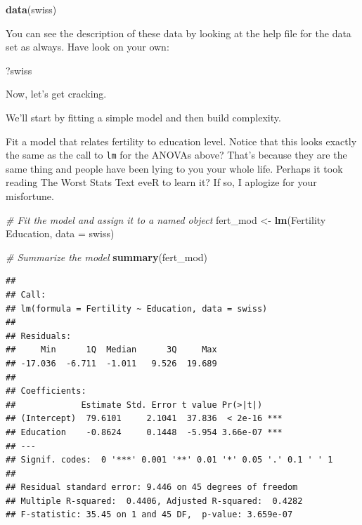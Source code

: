 \documentclass[
]{book}
\newenvironment{Shaded}{\begin{snugshade}}{\end{snugshade}}
\newcommand{\CommentTok}[1]{\textcolor[rgb]{0.56,0.35,0.01}{\textit{#1}}}
\newcommand{\DataTypeTok}[1]{\textcolor[rgb]{0.13,0.29,0.53}{#1}}
\newcommand{\KeywordTok}[1]{\textcolor[rgb]{0.13,0.29,0.53}{\textbf{#1}}}
\newcommand{\NormalTok}[1]{#1}
\newcommand{\OperatorTok}[1]{\textcolor[rgb]{0.81,0.36,0.00}{\textbf{#1}}}
\newcommand{\StringTok}[1]{\textcolor[rgb]{0.31,0.60,0.02}{#1}}
\begin{document}
\begin{Shaded}
\begin{Highlighting}[]
\KeywordTok{data}\NormalTok{(swiss)}
\end{Highlighting}
\end{Shaded}

You can see the description of these data by looking at the help file for the data set as always. Have look on your own:

\begin{Shaded}
\begin{Highlighting}[]
\NormalTok{?swiss}
\end{Highlighting}
\end{Shaded}

Now, let's get cracking.

We'll start by fitting a simple model and then build complexity.

Fit a model that relates fertility to education level. Notice that this looks exactly the same as the call to \texttt{lm} for the ANOVAs above? That's because they are the same thing and people have been lying to you your whole life. Perhaps it took reading The Worst Stats Text eveR to learn it? If so, I aplogize for your misfortune.

\begin{Shaded}
\begin{Highlighting}[]
\CommentTok{# Fit the model and assign it to a named object}
\NormalTok{fert_mod <-}\StringTok{ }\KeywordTok{lm}\NormalTok{(Fertility }\OperatorTok{~}\StringTok{ }\NormalTok{Education, }\DataTypeTok{data =}\NormalTok{ swiss)}

\CommentTok{# Summarize the model}
\KeywordTok{summary}\NormalTok{(fert_mod)}
\end{Highlighting}
\end{Shaded}

\begin{verbatim}
## 
## Call:
## lm(formula = Fertility ~ Education, data = swiss)
## 
## Residuals:
##     Min      1Q  Median      3Q     Max 
## -17.036  -6.711  -1.011   9.526  19.689 
## 
## Coefficients:
##             Estimate Std. Error t value Pr(>|t|)    
## (Intercept)  79.6101     2.1041  37.836  < 2e-16 ***
## Education    -0.8624     0.1448  -5.954 3.66e-07 ***
## ---
## Signif. codes:  0 '***' 0.001 '**' 0.01 '*' 0.05 '.' 0.1 ' ' 1
## 
## Residual standard error: 9.446 on 45 degrees of freedom
## Multiple R-squared:  0.4406,	Adjusted R-squared:  0.4282 
## F-statistic: 35.45 on 1 and 45 DF,  p-value: 3.659e-07
\end{verbatim}
\end{document}
